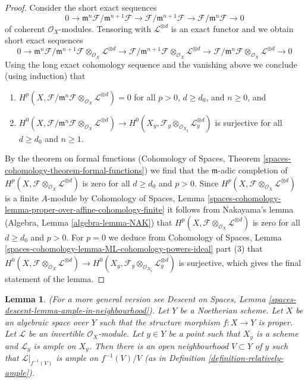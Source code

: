\documentclass{stacks-project}
\theoremstyle{plain}
\newtheorem{lemma}[subsection]{Lemma}
\theoremstyle{definition}
\theoremstyle{remark}
\numberwithin{equation}{subsection}
\begin{document}
\begin{proof}
\medskip\noindent
Consider the short exact sequences
$$
0 \to \mathfrak m^n\mathcal{F}/\mathfrak m^{n + 1} \mathcal{F}
\to \mathcal{F}/\mathfrak m^{n + 1} \mathcal{F}
\to \mathcal{F}/\mathfrak m^n \mathcal{F} \to 0
$$
of coherent $\mathcal{O}_X$-modules. Tensoring with $\mathcal{L}^{\otimes d}$
is an exact functor and we obtain short exact sequences
$$
0 \to
\mathfrak m^n\mathcal{F}/\mathfrak m^{n + 1} \mathcal{F}
\otimes_{\mathcal{O}_X} \mathcal{L}^{\otimes d}
\to \mathcal{F}/\mathfrak m^{n + 1} \mathcal{F}
\otimes_{\mathcal{O}_X} \mathcal{L}^{\otimes d}
\to \mathcal{F}/\mathfrak m^n \mathcal{F}
\otimes_{\mathcal{O}_X} \mathcal{L}^{\otimes d} \to 0
$$
Using the long exact cohomology sequence and the vanishing above
we conclude (using induction) that
\begin{enumerate}
\item $H^p(X, \mathcal{F}/\mathfrak m^n \mathcal{F}
\otimes_{\mathcal{O}_X} \mathcal{L}^{\otimes d}) = 0$
for all $p > 0$, $d \geq d_0$, and $n \geq 0$, and
\item $H^0(X, \mathcal{F}/\mathfrak m^n \mathcal{F}
\otimes_{\mathcal{O}_X} \mathcal{L}^{\otimes d}) \to
H^0(X_y, \mathcal{F}_y \otimes_{\mathcal{O}_{X_y}} \mathcal{L}_y^{\otimes d})$
is surjective for all $d \geq d_0$ and $n \geq 1$.
\end{enumerate}
By the theorem on formal functions
(Cohomology of Spaces, Theorem
\ref{spaces-cohomology-theorem-formal-functions})
we find that the $\mathfrak m$-adic completion of
$H^p(X, \mathcal{F} \otimes_{\mathcal{O}_X} \mathcal{L}^{\otimes d})$
is zero for all $d \geq d_0$ and $p > 0$.
Since $H^p(X, \mathcal{F} \otimes_{\mathcal{O}_X} \mathcal{L}^{\otimes d})$
is a finite $A$-module by
Cohomology of Spaces, Lemma
\ref{spaces-cohomology-lemma-proper-over-affine-cohomology-finite}
it follows from Nakayama's lemma (Algebra, Lemma \ref{algebra-lemma-NAK})
that $H^p(X, \mathcal{F} \otimes_{\mathcal{O}_X} \mathcal{L}^{\otimes d})$
is zero for all $d \geq d_0$ and $p > 0$.
For $p = 0$ we deduce from
Cohomology of Spaces, Lemma
\ref{spaces-cohomology-lemma-ML-cohomology-powers-ideal} part (3)
that $H^0(X, \mathcal{F} \otimes_{\mathcal{O}_X} \mathcal{L}^{\otimes d}) \to
H^0(X_y, \mathcal{F}_y \otimes_{\mathcal{O}_{X_y}} \mathcal{L}_y^{\otimes d})$
is surjective, which gives the final statement of the lemma.
\end{proof}

\begin{lemma}
\label{lemma-ample-in-neighbourhood}
(For a more general version see
Descent on Spaces, Lemma \ref{spaces-descent-lemma-ample-in-neighbourhood}).
Let $Y$ be a Noetherian scheme. Let $X$ be an algebraic space over $Y$
such that the structure morphism $f : X \to Y$ is proper.
Let $\mathcal{L}$ be an invertible $\mathcal{O}_X$-module.
Let $y \in Y$ be a point such that $X_y$ is a scheme and
$\mathcal{L}_y$ is ample on $X_y$.
Then there is an open neighbourhood $V \subset Y$
of $y$ such that $\mathcal{L}|_{f^{-1}(V)}$ is ample on $f^{-1}(V)/V$
(as in Definition \ref{definition-relatively-ample}).
\end{lemma}
\end{document}
